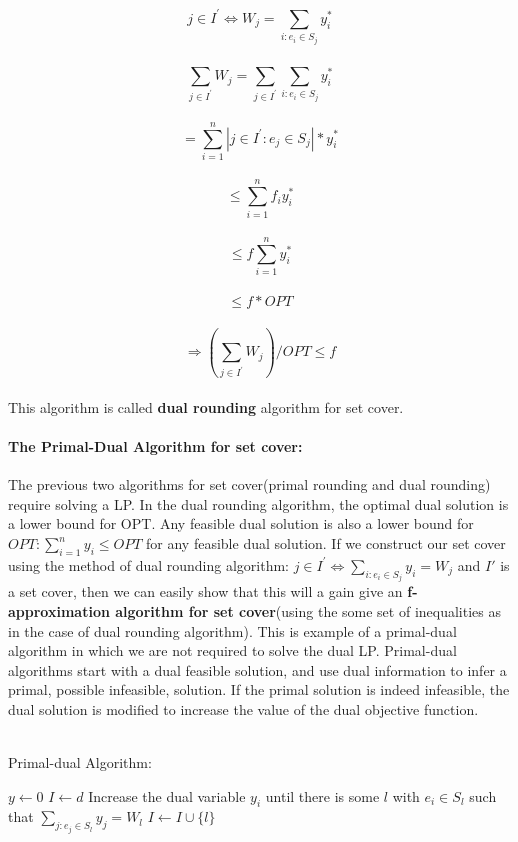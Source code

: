\documentclass[12pt]{article}
\begin{document}
$$j \in I^{'} \Leftrightarrow W_j = \sum_{i:e_i \in S_j}^{}y_i^{*}$$
\\
$$\sum_{j \in I^{'}}^{}W_j = \sum_{j \in I^{'}}^{} \sum_{i:e_i \in S_j}^{}y_i^{*}$$
\\
$$= \sum_{i=1}^{n} |{j \in I^{'}: e_j \in S_j}| * y_i^{*}$$
\\
$$\leq \sum_{i=1}^{n} f_i y_i^{*}$$
\\
$$\leq f \sum_{i=1}^{n} y_i^{*}$$
\\
$$\leq f * OPT$$
\\
$$\Rightarrow (\sum_{j \in I^{'}}^{} W_j)/OPT \leq f$$
\\
This algorithm is called \textbf{dual rounding} algorithm for set cover.

\paragraph{The Primal-Dual Algorithm for set cover:} The previous two algorithms for set cover(primal rounding and dual rounding) require solving a LP. In the dual rounding algorithm, the optimal dual solution is a lower bound for OPT. Any feasible dual solution is also a lower bound for $OPT: \sum_{i=1}^{n} y_i \leq OPT$ for any feasible dual solution. If we construct our set cover using the method of dual rounding algorithm: $j \in I^{'} \Leftrightarrow \sum_{i:e_i \in S_j}^{}y_i = W_j$ and $I'$ is a set cover, then we can easily show that this will a gain give an \textbf{f-approximation algorithm for set cover}(using the some set of inequalities as in the case of dual rounding algorithm). This is example of a primal-dual algorithm in which we are not required to solve the dual LP. Primal-dual algorithms start with a dual feasible solution, and use dual information to infer a primal, possible infeasible, solution. If the primal solution is indeed infeasible, the dual solution is modified to increase the value of the dual objective function.
\\
\\

\begin{algorithm}
\caption{Primal-dual Algorithm:}
\label{pseudoPSO}
\begin{algorithmic}[1]
\State $y \leftarrow 0$
\State $I \leftarrow d$
\State Increase the dual variable $y_i$ until there is some $l$ with $e_i \in S_l$ such that $\sum_{j:e_j \in S_l}^{} y_j = W_l$
\State $I \leftarrow I \cup \{l\}$
\EndWhile
\end{algorithmic}
\end{algorithm}
\end{document}
